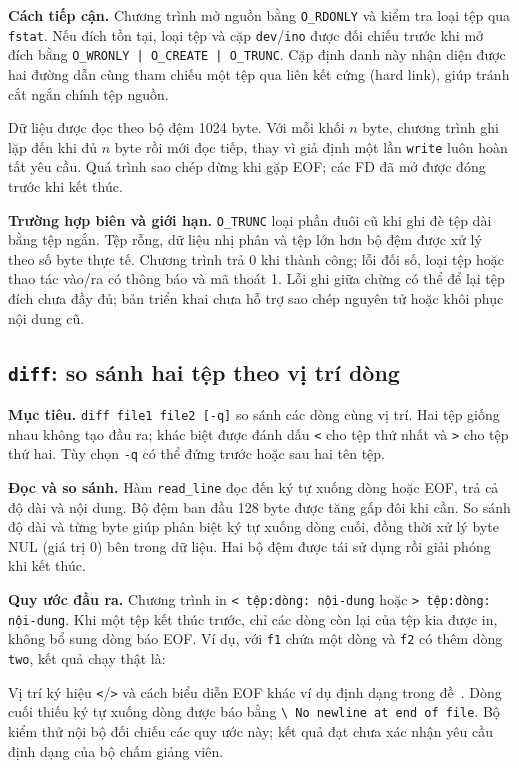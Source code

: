 \documentclass[12pt,a4paper]{article}
\newcommand{\code}[1]{\texttt{#1}}
\begin{document}
\textbf{Cách tiếp cận.} Chương trình mở nguồn bằng \code{O\_RDONLY} và kiểm tra loại tệp qua \code{fstat}. Nếu đích tồn tại, loại tệp và cặp \code{dev}/\code{ino} được đối chiếu trước khi mở đích bằng \code{O\_WRONLY | O\_CREATE | O\_TRUNC}. Cặp định danh này nhận diện được hai đường dẫn cùng tham chiếu một tệp qua liên kết cứng (hard link), giúp tránh cắt ngắn chính tệp nguồn.

Dữ liệu được đọc theo bộ đệm 1024 byte. Với mỗi khối $n$ byte, chương trình ghi lặp đến khi đủ $n$ byte rồi mới đọc tiếp, thay vì giả định một lần \code{write} luôn hoàn tất yêu cầu. Quá trình sao chép dừng khi gặp EOF; các FD đã mở được đóng trước khi kết thúc.

\textbf{Trường hợp biên và giới hạn.} \code{O\_TRUNC} loại phần đuôi cũ khi ghi đè tệp dài bằng tệp ngắn. Tệp rỗng, dữ liệu nhị phân và tệp lớn hơn bộ đệm được xử lý theo số byte thực tế. Chương trình trả 0 khi thành công; lỗi đối số, loại tệp hoặc thao tác vào/ra có thông báo và mã thoát 1. Lỗi ghi giữa chừng có thể để lại tệp đích chưa đầy đủ; bản triển khai chưa hỗ trợ sao chép nguyên tử hoặc khôi phục nội dung cũ.

\subsection{\texttt{diff}: so sánh hai tệp theo vị trí dòng}
\textbf{Mục tiêu.} \code{diff file1 file2 [-q]} so sánh các dòng cùng vị trí. Hai tệp giống nhau không tạo đầu ra; khác biệt được đánh dấu \code{<} cho tệp thứ nhất và \code{>} cho tệp thứ hai. Tùy chọn \code{-q} có thể đứng trước hoặc sau hai tên tệp.

\textbf{Đọc và so sánh.} Hàm \code{read\_line} đọc đến ký tự xuống dòng hoặc EOF, trả cả độ dài và nội dung. Bộ đệm ban đầu 128 byte được tăng gấp đôi khi cần. So sánh độ dài và từng byte giúp phân biệt ký tự xuống dòng cuối, đồng thời xử lý byte NUL (giá trị 0) bên trong dữ liệu. Hai bộ đệm được tái sử dụng rồi giải phóng khi kết thúc.

\textbf{Quy ước đầu ra.} Chương trình in \code{< tệp:dòng: nội-dung} hoặc \code{> tệp:dòng: nội-dung}. Khi một tệp kết thúc trước, chỉ các dòng còn lại của tệp kia được in, không bổ sung dòng báo EOF. Ví dụ, với \code{f1} chứa một dòng và \code{f2} có thêm dòng \code{two}, kết quả chạy thật là:
Vị trí ký hiệu \code{<}/\code{>} và cách biểu diễn EOF khác ví dụ định dạng trong đề~\cite{assignment}. Dòng cuối thiếu ký tự xuống dòng được báo bằng \code{\textbackslash{} No newline at end of file}. Bộ kiểm thử nội bộ đối chiếu các quy ước này; kết quả đạt chưa xác nhận yêu cầu định dạng của bộ chấm giảng viên.
\end{document}
